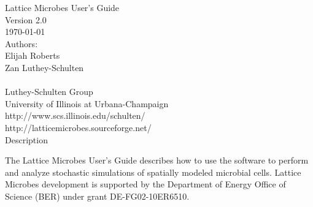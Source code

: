 \documentclass[11pt]{report}
\begin{document}
\newpage
\singlespacing
\normalsize
\setcounter{page}{1}
\renewcommand{\thepage}{\roman{page}}

\thispagestyle{empty}
\begin{center}{
\vspace*{0.85in}
{\huge Lattice Microbes User's Guide}\\
\vspace*{0.5in}
{\large Version 2.0}\\
{\large \today}\\
\vspace*{0.9in}
{\large Authors:}\\
{\large Elijah Roberts}\\
{\large Zan Luthey-Schulten}\\
~\\
{\large Luthey-Schulten Group}\\
{\large University of Illinois at Urbana-Champaign}\\
{\large http://www.scs.illinois.edu/schulten/}\\
{\large http://latticemicrobes.sourceforge.net/}\\
\vspace*{1.45in}
{\Large Description}\\
}\end{center}

The Lattice Microbes User's Guide describes how to use the software to perform and analyze stochastic simulations of spatially modeled microbial cells. Lattice Microbes development is supported by the Department of Energy Office of Science (BER) under grant DE-FG02-10ER6510. 

\newpage
\tableofcontents

\newpage
{}
\listoftables

\newpage
{}
\listoffigures


\newpage
\setcounter{page}{1}
\renewcommand{\thepage}{\arabic{page}}





\newpage
{}


\end{document}
